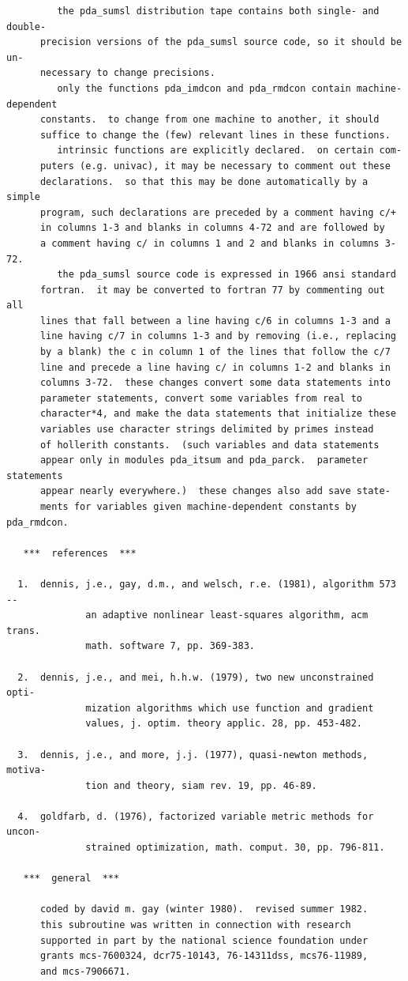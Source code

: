 \documentclass[11pt,twoside]{article}
\begin{document}
\begin{verbatim}
         the pda_sumsl distribution tape contains both single- and double-
      precision versions of the pda_sumsl source code, so it should be un-
      necessary to change precisions.
         only the functions pda_imdcon and pda_rmdcon contain machine-dependent
      constants.  to change from one machine to another, it should
      suffice to change the (few) relevant lines in these functions.
         intrinsic functions are explicitly declared.  on certain com-
      puters (e.g. univac), it may be necessary to comment out these
      declarations.  so that this may be done automatically by a simple
      program, such declarations are preceded by a comment having c/+
      in columns 1-3 and blanks in columns 4-72 and are followed by
      a comment having c/ in columns 1 and 2 and blanks in columns 3-72.
         the pda_sumsl source code is expressed in 1966 ansi standard
      fortran.  it may be converted to fortran 77 by commenting out all
      lines that fall between a line having c/6 in columns 1-3 and a
      line having c/7 in columns 1-3 and by removing (i.e., replacing
      by a blank) the c in column 1 of the lines that follow the c/7
      line and precede a line having c/ in columns 1-2 and blanks in
      columns 3-72.  these changes convert some data statements into
      parameter statements, convert some variables from real to
      character*4, and make the data statements that initialize these
      variables use character strings delimited by primes instead
      of hollerith constants.  (such variables and data statements
      appear only in modules pda_itsum and pda_parck.  parameter statements
      appear nearly everywhere.)  these changes also add save state-
      ments for variables given machine-dependent constants by pda_rmdcon.
 
   ***  references  ***
 
  1.  dennis, j.e., gay, d.m., and welsch, r.e. (1981), algorithm 573 --
              an adaptive nonlinear least-squares algorithm, acm trans.
              math. software 7, pp. 369-383.
 
  2.  dennis, j.e., and mei, h.h.w. (1979), two new unconstrained opti-
              mization algorithms which use function and gradient
              values, j. optim. theory applic. 28, pp. 453-482.
 
  3.  dennis, j.e., and more, j.j. (1977), quasi-newton methods, motiva-
              tion and theory, siam rev. 19, pp. 46-89.
 
  4.  goldfarb, d. (1976), factorized variable metric methods for uncon-
              strained optimization, math. comput. 30, pp. 796-811.
 
   ***  general  ***
 
      coded by david m. gay (winter 1980).  revised summer 1982.
      this subroutine was written in connection with research
      supported in part by the national science foundation under
      grants mcs-7600324, dcr75-10143, 76-14311dss, mcs76-11989,
      and mcs-7906671.



\end{verbatim}
\end{document}
